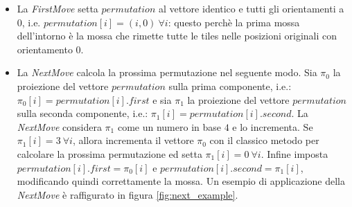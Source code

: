     \begin{itemize}
    	\item La \textit{FirstMove} setta $permutation$ al vettore identico e tutti gli orientamenti a $0$, i.e. $permutation[i] = (i,0) \ \forall i$: questo perchè la prima mossa dell'intorno è la mossa che rimette tutte le tiles nelle posizioni originali con orientamento $0$.
    	\item La \textit{NextMove} calcola la prossima permutazione nel seguente modo. Sia $\pi_0$ la proiezione del vettore $permutation$ sulla prima componente, i.e.: $\pi_0[i] = permutation[i].first$ e sia $\pi_1$ la proiezione del vettore $permutation$ sulla seconda componente, i.e.: $\pi_1[i] = permutation[i].second$. La \textit{NextMove} considera $\pi_1$ come un numero in base $4$ e lo incrementa. Se $\pi_1[i] = 3 \ \forall i$, allora incrementa il vettore $\pi_0$ con il classico metodo per calcolare la prossima permutazione ed setta $\pi_1[i] = 0 \ \forall i$. Infine imposta $permutation[i].first = \pi_0[i]$ e $permutation[i].second = \pi_1[i]$, modificando quindi correttamente la mossa. Un esempio di applicazione della \textit{NextMove} è raffigurato in figura \ref{fig:next_example}.

    	\begin{figure}[H]
            \centering
\end{figure}
\end{itemize}
